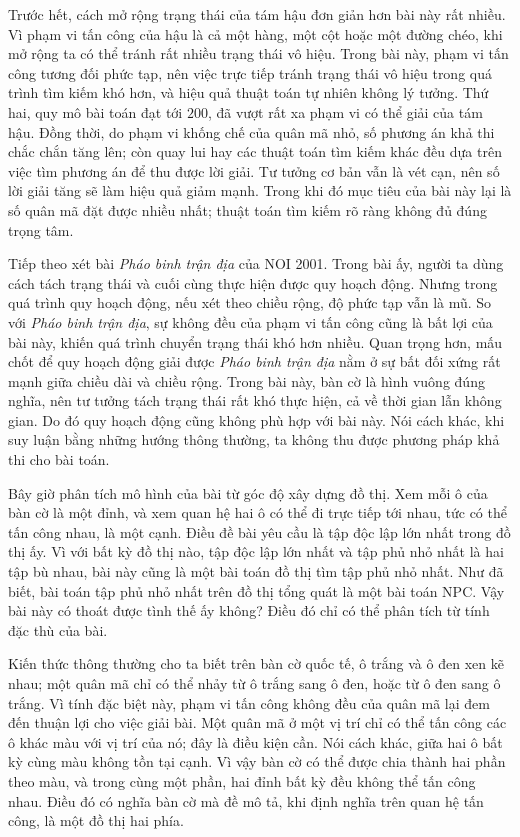\documentclass[11pt]{article}
\begin{document}
Trước hết, cách mở rộng trạng thái của tám hậu đơn giản hơn bài này rất
nhiều. Vì phạm vi tấn công của hậu là cả một hàng, một cột hoặc một đường
chéo, khi mở rộng ta có thể tránh rất nhiều trạng thái vô hiệu. Trong bài
này, phạm vi tấn công tương đối phức tạp, nên việc trực tiếp tránh trạng thái
vô hiệu trong quá trình tìm kiếm khó hơn, và hiệu quả thuật toán tự nhiên
không lý tưởng. Thứ hai, quy mô bài toán đạt tới \(200\), đã vượt rất xa
phạm vi có thể giải của tám hậu. Đồng thời, do phạm vi khống chế của quân mã
nhỏ, số phương án khả thi chắc chắn tăng lên; còn quay lui hay các thuật toán
tìm kiếm khác đều dựa trên việc tìm phương án để thu được lời giải. Tư tưởng
cơ bản vẫn là vét cạn, nên số lời giải tăng sẽ làm hiệu quả giảm mạnh. Trong
khi đó mục tiêu của bài này lại là số quân mã đặt được nhiều nhất; thuật toán
tìm kiếm rõ ràng không đủ đúng trọng tâm.

Tiếp theo xét bài \textit{Pháo binh trận địa} của NOI 2001. Trong bài ấy,
người ta dùng cách tách trạng thái và cuối cùng thực hiện được quy hoạch
động. Nhưng trong quá trình quy hoạch động, nếu xét theo chiều rộng, độ phức
tạp vẫn là mũ. So với \textit{Pháo binh trận địa}, sự không đều của phạm vi
tấn công cũng là bất lợi của bài này, khiến quá trình chuyển trạng thái khó
hơn nhiều. Quan trọng hơn, mấu chốt để quy hoạch động giải được
\textit{Pháo binh trận địa} nằm ở sự bất đối xứng rất mạnh giữa chiều dài và
chiều rộng. Trong bài này, bàn cờ là hình vuông đúng nghĩa, nên tư tưởng
tách trạng thái rất khó thực hiện, cả về thời gian lẫn không gian. Do đó quy
hoạch động cũng không phù hợp với bài này. Nói cách khác, khi suy luận bằng
những hướng thông thường, ta không thu được phương pháp khả thi cho bài toán.

Bây giờ phân tích mô hình của bài từ góc độ xây dựng đồ thị. Xem mỗi ô của
bàn cờ là một đỉnh, và xem quan hệ hai ô có thể đi trực tiếp tới nhau, tức
có thể tấn công nhau, là một cạnh. Điều đề bài yêu cầu là tập độc lập lớn
nhất trong đồ thị ấy. Vì với bất kỳ đồ thị nào, tập độc lập lớn nhất và tập
phủ nhỏ nhất là hai tập bù nhau, bài này cũng là một bài toán đồ thị tìm tập
phủ nhỏ nhất. Như đã biết, bài toán tập phủ nhỏ nhất trên đồ thị tổng quát là
một bài toán NPC. Vậy bài này có thoát được tình thế ấy không? Điều đó chỉ
có thể phân tích từ tính đặc thù của bài.

Kiến thức thông thường cho ta biết trên bàn cờ quốc tế, ô trắng và ô đen xen
kẽ nhau; một quân mã chỉ có thể nhảy từ ô trắng sang ô đen, hoặc từ ô đen
sang ô trắng. Vì tính đặc biệt này, phạm vi tấn công không đều của quân mã
lại đem đến thuận lợi cho việc giải bài. Một quân mã ở một vị trí chỉ có thể
tấn công các ô khác màu với vị trí của nó; đây là điều kiện cần. Nói cách
khác, giữa hai ô bất kỳ cùng màu không tồn tại cạnh. Vì vậy bàn cờ có thể
được chia thành hai phần theo màu, và trong cùng một phần, hai đỉnh bất kỳ
đều không thể tấn công nhau. Điều đó có nghĩa bàn cờ mà đề mô tả, khi định
nghĩa trên quan hệ tấn công, là một đồ thị hai phía.
\end{document}
